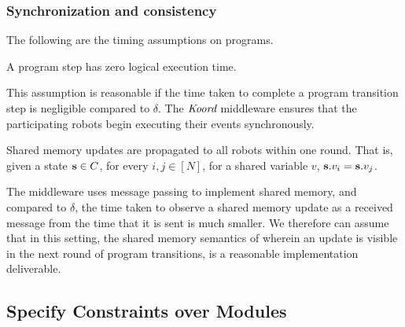\subsubsection{Synchronization and consistency}
The following are the timing assumptions on \lgname programs.
\begin{assumption} A program step has zero logical execution time.
\end{assumption}
This assumption is reasonable if the time taken to complete a program transition step is negligible compared to $\delta$.  The $\emph{Koord}$ middleware ensures that the participating robots begin executing their events synchronously.

\begin{assumption}
    \label{shared}
    Shared memory updates are propagated to all robots within one round. That is, given a state ${\textbf{s}}\in C$, for every  $i,j \in [N]$, for a shared variable $v$, ${\textbf{s}}.v_i = {\textbf{s}}.v_j$.
\end{assumption}
The \lgname middleware uses message passing to implement shared memory, and compared to $\delta$, the time taken to observe a shared memory update as a received message from the time that it is sent is much smaller. We therefore can assume that in this setting, the shared memory semantics of \lgname wherein an update is visible in the next round of program transitions, is a reasonable implementation deliverable.



\subsection{Specify Constraints over Modules}
\label{sec:module}
